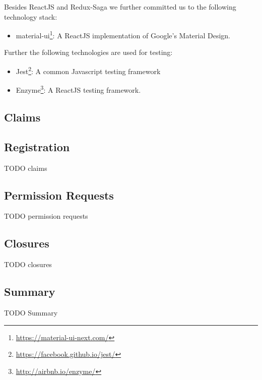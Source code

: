 Besides ReactJS and Redux-Saga we further committed us to the following technology stack:

\begin{itemize}
\item material-ui\footnote{\url{https://material-ui-next.com/}}: A ReactJS implementation of Google's Material Design.
\end{itemize}

Further the following technologies are used for testing:

\begin{itemize}
\item Jest\footnote{\url{https://facebook.github.io/jest/}}: A common Javascript testing framework
\item Enzyme\footnote{\url{http://airbnb.io/enzyme/}}: A ReactJS testing framework.
\end{itemize}

\subsection{Claims}
\subsection{Registration}
\label{sec:registerContract}

TODO claims

\subsection{Permission Requests}
\label{sec:ppr}

TODO permission requests

\subsection{Closures}
\label{sec:closure}

TODO closures

\subsection{Summary}
\label{sec:frontendSummary}
TODO Summary


